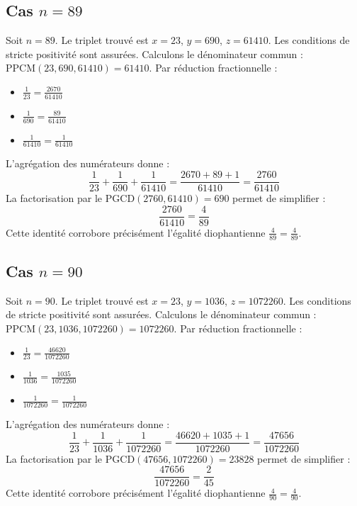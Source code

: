 \documentclass[11pt,a4paper]{article}
\begin{document}
\subsection{Cas $n = 89$}
Soit $n = 89$. Le triplet trouvé est $x = 23$, $y = 690$, $z = 61410$.
Les conditions de stricte positivité sont assurées.
Calculons le dénominateur commun : $\text{PPCM}(23, 690, 61410) = 61410$.
Par réduction fractionnelle :
\begin{itemize}
    \item $\frac{1}{23} = \frac{2670}{61410}$
    \item $\frac{1}{690} = \frac{89}{61410}$
    \item $\frac{1}{61410} = \frac{1}{61410}$
\end{itemize}
L'agrégation des numérateurs donne :
$$ \frac{1}{23} + \frac{1}{690} + \frac{1}{61410} = \frac{2670 + 89 + 1}{61410} = \frac{2760}{61410} $$
La factorisation par le $\text{PGCD}(2760, 61410) = 690$ permet de simplifier :
$$ \frac{2760}{61410} = \frac{4}{89} $$
Cette identité corrobore précisément l'égalité diophantienne $\frac{4}{89} = \frac{4}{89}$.

\subsection{Cas $n = 90$}
Soit $n = 90$. Le triplet trouvé est $x = 23$, $y = 1036$, $z = 1072260$.
Les conditions de stricte positivité sont assurées.
Calculons le dénominateur commun : $\text{PPCM}(23, 1036, 1072260) = 1072260$.
Par réduction fractionnelle :
\begin{itemize}
    \item $\frac{1}{23} = \frac{46620}{1072260}$
    \item $\frac{1}{1036} = \frac{1035}{1072260}$
    \item $\frac{1}{1072260} = \frac{1}{1072260}$
\end{itemize}
L'agrégation des numérateurs donne :
$$ \frac{1}{23} + \frac{1}{1036} + \frac{1}{1072260} = \frac{46620 + 1035 + 1}{1072260} = \frac{47656}{1072260} $$
La factorisation par le $\text{PGCD}(47656, 1072260) = 23828$ permet de simplifier :
$$ \frac{47656}{1072260} = \frac{2}{45} $$
Cette identité corrobore précisément l'égalité diophantienne $\frac{4}{90} = \frac{4}{90}$.
\end{document}

